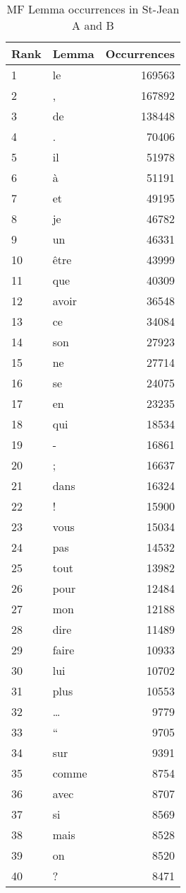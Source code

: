 \begin{table}
  \centering
  \caption{MF Lemma occurrences in St-Jean A and B}
  \label{tab:lemmas_occurences_st_jean}
  \begin{tabular}{l l r}
    \toprule
    Rank & Lemma & Occurrences \\
    \midrule
    1 & le & 169563 \\
    2 & , & 167892 \\
    3 & de & 138448 \\
    4 & . & 70406 \\
    5 & il & 51978 \\
    6 & à & 51191 \\
    7 & et & 49195 \\
    8 & je & 46782 \\
    9 & un & 46331 \\
    10 & être & 43999 \\
    11 & que & 40309 \\
    12 & avoir & 36548 \\
    13 & ce & 34084 \\
    14 & son & 27923 \\
    15 & ne & 27714 \\
    16 & se & 24075 \\
    17 & en & 23235 \\
    18 & qui & 18534 \\
    19 & - & 16861 \\
    20 & ; & 16637 \\
    21 & dans & 16324 \\
    22 & ! & 15900 \\
    23 & vous & 15034 \\
    24 & pas & 14532 \\
    25 & tout & 13982 \\
    26 & pour & 12484 \\
    27 & mon & 12188 \\
    28 & dire & 11489 \\
    29 & faire & 10933 \\
    30 & lui & 10702 \\
    31 & plus & 10553 \\
    32 & … & 9779 \\
    33 & “ & 9705 \\
    34 & sur & 9391 \\
    35 & comme & 8754 \\
    36 & avec & 8707 \\
    37 & si & 8569 \\
    38 & mais & 8528 \\
    39 & on & 8520 \\
    40 & ? & 8471 \\
    \bottomrule
  \end{tabular}
\end{table}

